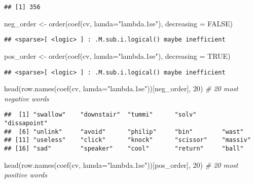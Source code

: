 \documentclass[
]{article}
\newenvironment{Shaded}{\begin{snugshade}}{\end{snugshade}}
\newcommand{\AttributeTok}[1]{\textcolor[rgb]{0.77,0.63,0.00}{#1}}
\newcommand{\CommentTok}[1]{\textcolor[rgb]{0.56,0.35,0.01}{\textit{#1}}}
\newcommand{\ConstantTok}[1]{\textcolor[rgb]{0.00,0.00,0.00}{#1}}
\newcommand{\DecValTok}[1]{\textcolor[rgb]{0.00,0.00,0.81}{#1}}
\newcommand{\FunctionTok}[1]{\textcolor[rgb]{0.00,0.00,0.00}{#1}}
\newcommand{\NormalTok}[1]{#1}
\newcommand{\OtherTok}[1]{\textcolor[rgb]{0.56,0.35,0.01}{#1}}
\newcommand{\StringTok}[1]{\textcolor[rgb]{0.31,0.60,0.02}{#1}}
\begin{document}
\begin{verbatim}
## [1] 356
\end{verbatim}

\begin{Shaded}
\begin{Highlighting}[]
\NormalTok{neg\_order }\OtherTok{\textless{}{-}} \FunctionTok{order}\NormalTok{(}\FunctionTok{coef}\NormalTok{(cv, }\AttributeTok{lamda=}\StringTok{"lambda.1se"}\NormalTok{), }\AttributeTok{decreasing =} \ConstantTok{FALSE}\NormalTok{)}
\end{Highlighting}
\end{Shaded}

\begin{verbatim}
## <sparse>[ <logic> ] : .M.sub.i.logical() maybe inefficient
\end{verbatim}

\begin{Shaded}
\begin{Highlighting}[]
\NormalTok{pos\_order }\OtherTok{\textless{}{-}} \FunctionTok{order}\NormalTok{(}\FunctionTok{coef}\NormalTok{(cv, }\AttributeTok{lamda=}\StringTok{"lambda.1se"}\NormalTok{), }\AttributeTok{decreasing =} \ConstantTok{TRUE}\NormalTok{)}
\end{Highlighting}
\end{Shaded}

\begin{verbatim}
## <sparse>[ <logic> ] : .M.sub.i.logical() maybe inefficient
\end{verbatim}

\begin{Shaded}
\begin{Highlighting}[]
\FunctionTok{head}\NormalTok{(}\FunctionTok{row.names}\NormalTok{(}\FunctionTok{coef}\NormalTok{(cv, }\AttributeTok{lamda=}\StringTok{"lambda.1se"}\NormalTok{))[neg\_order], }\DecValTok{20}\NormalTok{) }\CommentTok{\# 20 most negative words}
\end{Highlighting}
\end{Shaded}

\begin{verbatim}
##  [1] "swallow"    "downstair"  "tummi"      "solv"       "dissapoint"
##  [6] "unlink"     "avoid"      "philip"     "bin"        "wast"      
## [11] "useless"    "click"      "knock"      "scissor"    "massiv"    
## [16] "sad"        "speaker"    "cool"       "return"     "ball"
\end{verbatim}

\begin{Shaded}
\begin{Highlighting}[]
\FunctionTok{head}\NormalTok{(}\FunctionTok{row.names}\NormalTok{(}\FunctionTok{coef}\NormalTok{(cv, }\AttributeTok{lamda=}\StringTok{"lambda.1se"}\NormalTok{))[pos\_order], }\DecValTok{20}\NormalTok{) }\CommentTok{\# 20 most positive words}
\end{Highlighting}
\end{Shaded}
\end{document}
